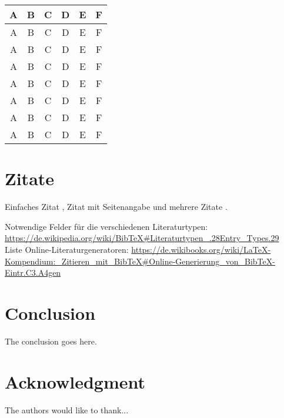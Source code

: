 \begin{table*}
\centering
\begin{tabular}{|c|c|c||c|c|c|}
\hline
A & B & C & D & E & F\\    \hline
A & B & C & D & E & F\\    \hline
A & B & C & D & E & F\\    \hline
A & B & C & D & E & F\\    \hline
A & B & C & D & E & F\\    \hline
A & B & C & D & E & F\\    \hline
A & B & C & D & E & F\\    \hline
A & B & C & D & E & F\\    \hline
\end{tabular}
\end{table*}


\section{Zitate}

Einfaches Zitat \cite{Madeyski2007OnTests}, Zitat mit Seitenangabe \cite[S. 15]{Erdogmus2005OnProgramming} und mehrere Zitate \cite{Holcombe2008SevenImprovement,Fucci2016ATest-Last,Causevic2013EffectsExperiment}.

Notwendige Felder für die verschiedenen Literaturtypen: \url{https://de.wikipedia.org/wiki/BibTeX#Literaturtypen_.28Entry_Types.29} \\
Liste Online-Literaturgeneratoren: \url{https://de.wikibooks.org/wiki/LaTeX-Kompendium:_Zitieren_mit_BibTeX\#Online-Generierung_von_BibTeX-Eintr.C3.A4gen}

\section{Conclusion}
The conclusion goes here.



\section*{Acknowledgment}


The authors would like to thank...

